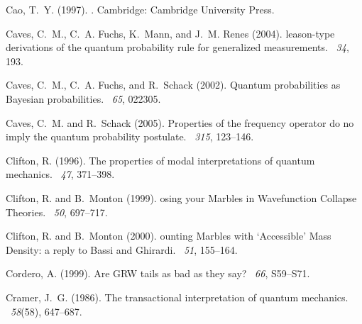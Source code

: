 \documentclass[12pt]{article}
\begin{document}
\begin{thebibliography}{}
Cao, T.~Y. (1997).
.
\newblock Cambridge: Cambridge University Press.

Caves, C.~M., C.~A. Fuchs, K.~Mann, and J.~M. Renes (2004).
leason-type derivations of the quantum probability rule for
  generalized measurements.
~{\em 34}, 193.

Caves, C.~M., C.~A. Fuchs, and R.~Schack (2002).
\newblock Quantum probabilities as {B}ayesian probabilities.
~{\em 65}, 022305.

Caves, C.~M. and R.~Schack (2005).
\newblock Properties of the frequency operator do no imply the quantum
  probability postulate.
~{\em 315}, 123--146.

Clifton, R. (1996).
\newblock The properties of modal interpretations of quantum mechanics.
~{\em 47},
  371--398.

Clifton, R. and B.~Monton (1999).
osing your {M}arbles in {W}avefunction {C}ollapse {T}heories.
~{\em 50},
  697--717.

Clifton, R. and B.~Monton (2000).
ounting {M}arbles with `{A}ccessible' {M}ass {D}ensity: a reply to
  {B}assi and {G}hirardi.
~{\em 51},
  155--164.

Cordero, A. (1999).
\newblock Are {GRW} tails as bad as they say?
~{\em 66}, S59--S71.

Cramer, J.~G. (1986).
\newblock The transactional interpretation of quantum mechanics.
~{\em 58\/}(58), 647--687.


\end{thebibliography}
\end{document}
